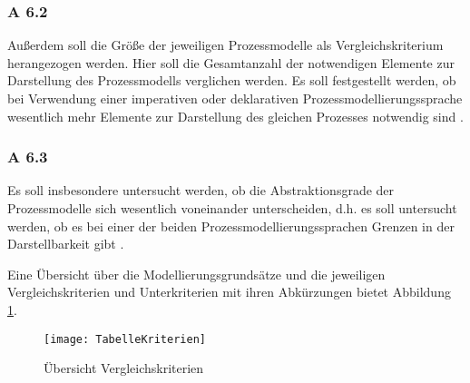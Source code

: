 \subsubsection{A 6.2}
Außerdem soll die Größe der jeweiligen Prozessmodelle als Vergleichskriterium herangezogen werden. Hier soll die Gesamtanzahl der notwendigen Elemente zur Darstellung des Prozessmodells verglichen werden. Es soll festgestellt werden, ob bei Verwendung einer imperativen oder deklarativen Prozessmodellierungssprache wesentlich mehr Elemente zur Darstellung des gleichen Prozesses notwendig sind \cite{leimeister2012, journals95, freund2007,reinshagen2009}.

 \subsubsection{A 6.3}
Es soll insbesondere untersucht werden, ob die Abstraktionsgrade der Prozessmodelle sich wesentlich voneinander unterscheiden, d.h. es soll untersucht werden, ob es bei einer der beiden Prozessmodellierungssprachen Grenzen in der Darstellbarkeit gibt \cite{leimeister2012, journals95, freund2007,reinshagen2009}.

Eine Übersicht über die Modellierungsgrundsätze und die jeweiligen Vergleichskriterien und Unterkriterien mit ihren Abkürzungen bietet Abbildung \ref{fig:TabelleKriterien}.

\begin{figure}[!htbp]
\begin{center}
  \texttt{[image: TabelleKriterien]} %
  \caption{Übersicht Vergleichskriterien}
  \label{fig:TabelleKriterien}
\end{center}
\end{figure}









